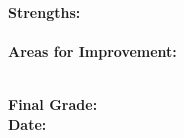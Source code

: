\documentclass[10pt, letterpaper]{article}
\begin{document}
\vspace{12pt}
\vspace{4pt}

\noindent\textbf{Strengths:}\\[4pt]
\\[20pt]
\vspace{8pt}
\noindent\textbf{Areas for Improvement:}\\[4pt]
\\[20pt]

\vspace{14pt}
\noindent

\textbf{Final Grade:} \underline{\hspace{3cm}}\\[4pt]
\textbf{Date:} \underline{\hspace{3cm}}
\end{document}
